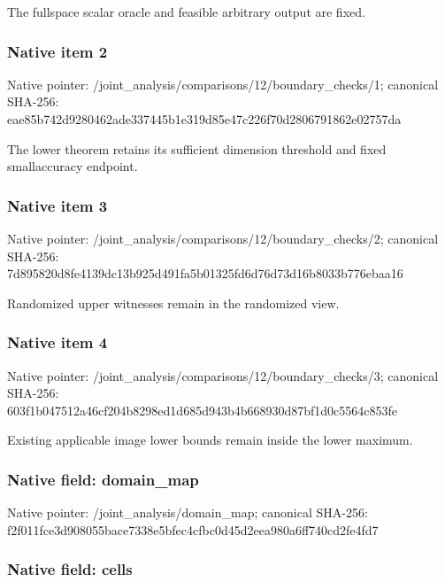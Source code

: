 \documentclass[10pt,a4paper]{article}
\begin{document}
The fullspace scalar oracle and feasible arbitrary output are fixed.


\subsubsection{Native item 2}


Native pointer: /joint\_analysis/comparis\allowbreak{}ons/12/boundary\_checks/1; canonical SHA-256: eae85b742d9280462ade3374\allowbreak{}45b1e319d85e47c226f70d28\allowbreak{}06791862e02757da


The lower theorem retains its sufficient dimension threshold and fixed smallaccuracy endpoint.


\subsubsection{Native item 3}


Native pointer: /joint\_analysis/comparis\allowbreak{}ons/12/boundary\_checks/2; canonical SHA-256: 7d895820d8fe4139dc13b925\allowbreak{}d491fa5b01325fd6d76d73d1\allowbreak{}6b8033b776ebaa16


Randomized upper witnesses remain in the randomized view.


\subsubsection{Native item 4}


Native pointer: /joint\_analysis/comparis\allowbreak{}ons/12/boundary\_checks/3; canonical SHA-256: 603f1b047512a46cf204b829\allowbreak{}8ed1d685d943b4b668930d87\allowbreak{}bf1d0c5564c853fe


Existing applicable image lower bounds remain inside the lower maximum.


\subsubsection{Native field: domain\_map}


Native pointer: /joint\_analysis/domain\_map; canonical SHA-256: f2f011fce3d908055bace733\allowbreak{}8e5bfec4cfbc0d45d2eea980\allowbreak{}a6ff740cd2fe4fd7



\subsubsection{Native field: cells}
\end{document}
